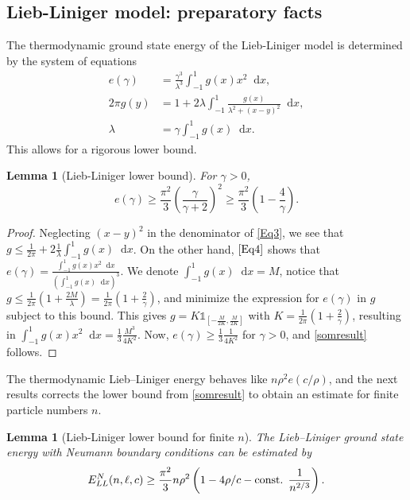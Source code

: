 \documentclass[a4paper,11pt]{article}
\newcommand*\diff{\mathop{}\!\mathrm{d}}
\newtheorem{lemma}[theorem]{Lemma}
\numberwithin{equation}{section}
\begin{document}
	\subsection{Lieb-Liniger model: preparatory facts}
	\label{secprep}
	The thermodynamic ground state energy of the Lieb-Liniger model is determined by the system of equations \cite{lieb1963exact}
	\begin{align}
	e(\gamma)&=\frac{\gamma^3}{\lambda^3}\int_{-1}^{1}g(x)x^2\diff x,\\
	2\pi g(y)&=1+2\lambda\int_{-1}^{1}\frac{g(x)}{\lambda^2+(x-y)^2}\diff x\label{Eq3},\\
	\lambda&=\gamma\int_{-1}^{1}g(x)\diff x.\label{Eq4}
	\end{align}
	This allows for a rigorous lower bound.
	\begin{lemma}[Lieb-Liniger lower bound] \label{LemmaLL-LowerBound}
		For $\gamma>0$,
		\begin{equation}
		\label{somresult}
		e(\gamma)\geq \frac{\pi^2}{3}\left(\frac{\gamma}{\gamma+2}\right)^2\geq \frac{\pi^2}{3}\left(1-\frac{4}{\gamma}\right).
		\end{equation}
	\end{lemma}
	\begin{proof}
		Neglecting $ (x-y)^2 $ in the denominator of \eqref{Eq3}, we see that $ g\leq \frac{1}{2\pi}+2\frac{1}{\lambda}\int_{-1}^{1}g(x)\diff x $. On the other hand, $ \eqref{Eq4} $ shows that $ e(\gamma)=\frac{\int_{-1}^{1}g(x)x^2\diff x}{\left(\int_{-1}^{1}g(x)\diff x\right)^3} $. We denote $ \int_{-1}^{1}g(x)\diff x=M $, notice that $ g\leq \frac{1}{2\pi}\left(1+\frac{2M}{\lambda}\right)=\frac{1}{2\pi}\left(1+\frac{2}{\gamma}\right)$, and minimize the expression for $e(\gamma)$ in $g$ subject to this bound. This gives $ g=K\mathds{1}_{[-\frac{M}{2K},\frac{M}{2K}]} $ with $ K=\frac{1}{2\pi}\left(1+\frac{2}{\gamma}\right) $, resulting in $ \int_{-1}^{1}g(x)x^2\diff x=\frac{1}{3}\frac{M^3}{4 K^2}$. Now, $e(\gamma)\geq \frac{1}{3}\frac{1}{4K^2}$ for $\gamma>0$, and \eqref{somresult} follows.
	\end{proof}
The thermodynamic Lieb--Liniger energy behaves like $n\rho^2 e(c/\rho)$, and the next results corrects the lower bound from \eqref{somresult} to obtain an estimate for finite particle numbers $n$.
	\begin{lemma}[Lieb-Liniger lower bound for finite $n$]\label{LemmaLiebLinigerNeumannLowerBound}
	The Lieb--Liniger ground state energy with Neumann boundary conditions can be estimated by
		\begin{equation}
		E_{LL}^{N}(n,\ell,c)\geq \frac{\pi^2}{3}n\rho^2\left(1-4\rho/c-\textnormal{const. }\frac{1}{n^{2/3}}\right).
		\end{equation}
	\end{lemma}
\end{document}
